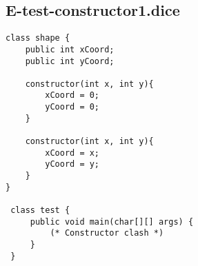 \subsection{E-test-constructor1.dice}
\begin{verbatim}
class shape {
	public int xCoord;
	public int yCoord;
	
	constructor(int x, int y){
		xCoord = 0;
		yCoord = 0;
	}

	constructor(int x, int y){
		xCoord = x;
		yCoord = y;
	}
}

 class test {
	 public void main(char[][] args) {
		 (* Constructor clash *)
	 }
 }
\end{verbatim}